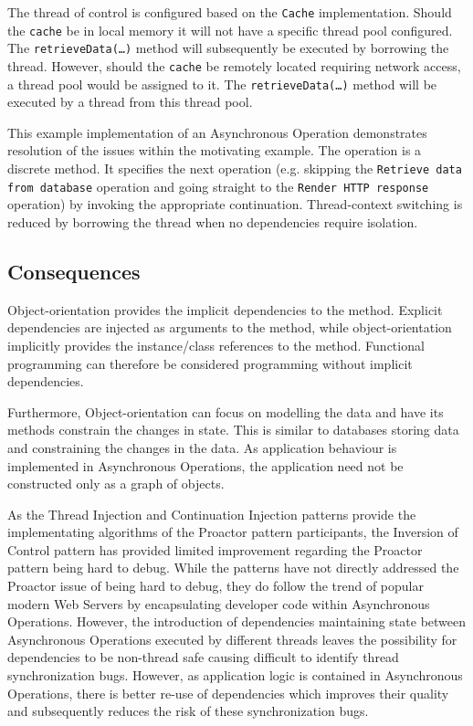 \documentclass[prodmode]{style/acmlarge}
\begin{document}
The thread of control is configured based on the \texttt{Cache} implementation.
 Should the \texttt{cache} be in local memory it will not have a specific thread
pool configured.  The \texttt{retrieveData(\ldots)} method will subsequently be
executed by borrowing the thread.  However, should the \texttt{cache} be
remotely located requiring network access, a thread pool would be assigned to
it.  The \texttt{retrieveData(\ldots)} method will be executed by a thread from
this thread pool.

This example implementation of an Asynchronous Operation demonstrates resolution
of the issues within the motivating example.  The operation is a discrete
method.  It specifies the next operation (e.g. skipping the \texttt{Retrieve
data from database} operation and going straight to the \texttt{Render HTTP
response} operation) by invoking the appropriate continuation.  Thread-context
switching is reduced by borrowing the thread when no dependencies require
isolation.


\subsection{Consequences}

Object-orientation provides the implicit dependencies to the method.  Explicit
dependencies are injected as arguments to the method, while object-orientation
implicitly provides the instance/class references to the method.  Functional
programming can therefore be considered programming without implicit
dependencies.

Furthermore, Object-orientation can focus on modelling the data and have its
methods constrain the changes in state.  This is similar to databases storing
data and constraining the changes in the data.  As application behaviour is
implemented in Asynchronous Operations, the application need not be constructed
only as a graph of objects.

As the Thread Injection and Continuation Injection patterns provide the
implementating algorithms of the Proactor pattern participants, the Inversion of
Control pattern has provided limited improvement regarding the Proactor pattern
being hard to debug.  While the patterns have not directly addressed the
Proactor issue of being hard to debug, they do follow the trend of popular
modern Web Servers by encapsulating developer code within Asynchronous
Operations.  However, the introduction of dependencies maintaining state between
Asynchronous Operations executed by different threads leaves the possibility for
dependencies to be non-thread safe causing difficult to identify thread
synchronization bugs.  However, as application logic is contained in
Asynchronous Operations, there is better re-use of dependencies which improves
their quality and subsequently reduces the risk of these synchronization bugs.
\end{document}
